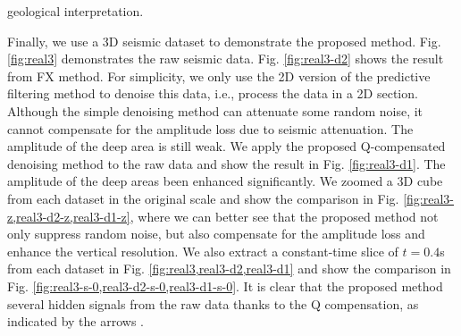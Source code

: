 geological interpretation.  

Finally, we use a 3D seismic dataset to demonstrate the proposed method. Fig. \ref{fig:real3} demonstrates the raw seismic data. Fig. \ref{fig:real3-d2} shows the result from  FX method. For simplicity, we only use the 2D version of the predictive filtering method to denoise this data, i.e., process the data in a 2D section. Although the simple denoising method can attenuate some random noise, it cannot compensate for the amplitude loss due to seismic attenuation. The amplitude of the deep area is still weak. We apply the proposed Q-compensated denoising method to the raw data and show the result in Fig. \ref{fig:real3-d1}. The amplitude of the deep areas  been enhanced significantly. We zoomed a 3D cube from each dataset in the original scale and show the comparison in Fig. \ref{fig:real3-z,real3-d2-z,real3-d1-z}, where we can better see that the proposed method not only suppress random noise, but also compensate for the amplitude loss and enhance the vertical resolution.  We also extract a constant-time slice of $t=0.4$s from each dataset in Fig. \ref{fig:real3,real3-d2,real3-d1} and show the comparison in Fig. \ref{fig:real3-s-0,real3-d2-s-0,real3-d1-s-0}. It is clear that the proposed method  several hidden signals from the raw data thanks to the Q compensation, as indicated by the arrows .  




